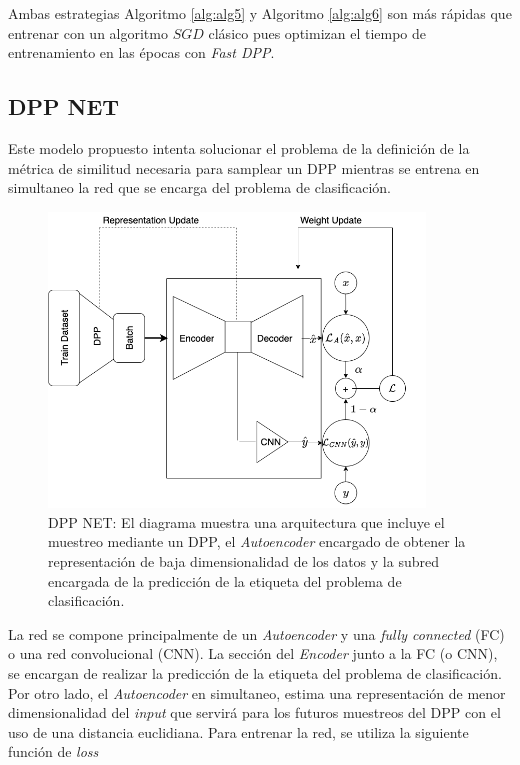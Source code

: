 
\vspace{0.2cm}

Ambas estrategias Algoritmo \ref{alg:alg5} y Algoritmo \ref{alg:alg6} son más rápidas que entrenar con un algoritmo $SGD$ clásico pues optimizan el tiempo de entrenamiento en las épocas con \textit{Fast DPP}. 

\subsection{DPP NET}

Este modelo propuesto intenta solucionar el problema de la definición de la métrica de similitud necesaria para samplear un DPP mientras se entrena en simultaneo la red que se encarga del problema de clasificación. 

\begin{figure}[ht]
    \centering
    \includegraphics[width=10cm]{img/tesis/dpp_net.png}
    \caption{DPP NET: El diagrama muestra una arquitectura que incluye el muestreo mediante un DPP, el \textit{Autoencoder} encargado de obtener la representación de baja dimensionalidad de los datos y la subred encargada de la predicción de la etiqueta del problema de clasificación.}
    \label{fig:dpp_net}
\end{figure}

\vspace{0.2cm}

La red se compone principalmente de un \textit{Autoencoder} y una \textit{fully connected} (FC) o una red convolucional (CNN). La sección del \textit{Encoder} junto a la FC (o CNN), se encargan de realizar la predicción de la etiqueta del problema de clasificación. Por otro lado, el \textit{Autoencoder} en simultaneo, estima una representación de menor dimensionalidad del \textit{input} que servirá para los futuros muestreos del DPP con el uso de una distancia euclidiana. Para entrenar la red, se utiliza la siguiente función de \textit{loss}

